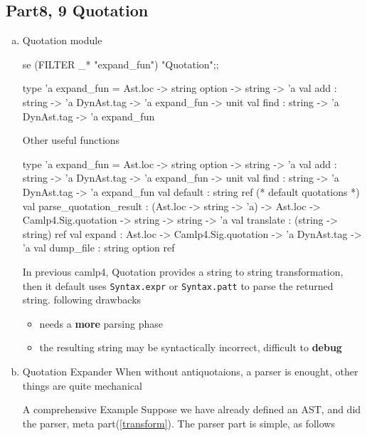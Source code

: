 \subsection{Part8, 9 Quotation}
  \begin{enumerate}[(a)]
  \item Quotation module
    \begin{ocamlcode}
      se (FILTER _* "expand_fun") "Quotation";;
    \end{ocamlcode}

    \begin{ocamlcode}
type 'a expand_fun = Ast.loc -> string option -> string -> 'a
val add : string -> 'a DynAst.tag -> 'a expand_fun -> unit
val find : string -> 'a DynAst.tag -> 'a expand_fun      
    \end{ocamlcode}

    Other useful functions 
    \begin{ocamlcode}
type 'a expand_fun = Ast.loc -> string option -> string -> 'a
val add : string -> 'a DynAst.tag -> 'a expand_fun -> unit
val find : string -> 'a DynAst.tag -> 'a expand_fun
val default : string ref  (* default quotations *)
val parse_quotation_result :
      (Ast.loc -> string -> 'a) ->
      Ast.loc -> Camlp4.Sig.quotation -> string -> string -> 'a
val translate : (string -> string) ref
val expand : Ast.loc -> Camlp4.Sig.quotation -> 'a DynAst.tag -> 'a
val dump_file : string option ref
    \end{ocamlcode}

    In previous camlp4, Quotation provides a string to string
    transformation, then it default uses \verb|Syntax.expr| or
    \verb|Syntax.patt| to parse the returned string. following
    drawbacks


    \begin{itemize}
    \item needs a \textbf{more} parsing phase
    \item the resulting string may be syntactically incorrect, difficult
      to \textbf{debug}
    \end{itemize}

\item Quotation Expander 
  When without antiquotaions, a parser is enought, other things are
  quite mechanical

  A comprehensive Example Suppose we have already defined an AST, and
  did the parser, meta part(\ref{transform}).
  The parser part is simple, as follows
\inputminted[fontsize=\scriptsize, firstline=41,lastline=62]{ocaml}{camlp4/code/jake/json.ml}



\end{enumerate}

